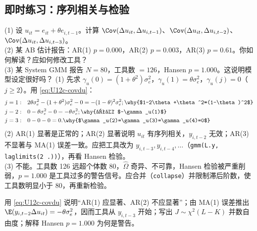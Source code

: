 \subsection{即时练习：序列相关与检验}

\begin{prac}[序列相关与检验]\label{pr:U12c-serial}
(1) 设 $u_{it}=e_{it}+\theta e_{i,t-1}$。计算 $\Cov(\Delta u_{it},\Delta u_{i,t-1})$、$\Cov(\Delta u_{it},\Delta u_{i,t-2})$、$\Cov(\Delta u_{it},\Delta u_{i,t-3})$。\\
(2) 某 AB 估计报告：AR(1) $p=0.000$，AR(2) $p=0.003$，AR(3) $p=0.61$。你如何解读？应如何修改工具？\\
(3) 某 System GMM 报告 $N=80$，工具数 $=126$，Hansen $p=1.000$。这说明模型设定很好吗？
\answer
(1) 先求 $\gamma_u(0)=(1+\theta^2)\sigma_e^2$，$\gamma_u(1)=\theta\sigma_e^2$，$\gamma_u(j)=0$（$j\ge2$）。用 \eqref{eq:U12c-covdu}：
\begin{align*}
j=1:&\quad 2\theta\sigma_e^2-(1+\theta^2)\sigma_e^2-0=-(1-\theta)^2\sigma_e^2; \why{$1-2\theta+\theta^2=(1-\theta)^2$}\\
j=2:&\quad 0-\theta\sigma_e^2-0=-\theta\sigma_e^2; \why{只剩 $-\gamma_u(1)$}\\
j=3:&\quad 0-0-0=0. \why{$\gamma_u(2)=\gamma_u(3)=\gamma_u(4)=0$}
\end{align*}
(2) AR(1) 显著是正常的；AR(2) 显著说明 $u_{it}$ 有序列相关，$y_{i,t-2}$ 无效；AR(3) 不显著与 MA(1) 误差一致。应把工具改为 $y_{i,t-3},y_{i,t-4},\dots$（\texttt{gmm(L.y, laglimits(2 .))}），再看 Hansen 检验。\\
(3) 不能。工具数 126 远超个体数 80，$\hat\Omega$ 奇异、不可靠，Hansen 检验被严重削弱，$p=1.000$ 是工具过多的警告信号。应合并（\texttt{collapse}）并限制滞后阶数，使工具数明显小于 80，再重新检验。
\end{prac}

\begin{keypt}[设定检验的常考点]
用 \eqref{eq:U12c-covdu} 说明“AR(1) 应显著、AR(2) 不应显著”；由 MA(1) 误差推出 $\E(y_{i,t-2}\Delta u_{it})=-\theta\sigma_e^2$，因而工具从 $y_{i,t-3}$ 开始；写出 $J\sim\chi^2(L-K)$ 并数自由度；解释 Hansen $p=1.000$ 为何是警告。
\end{keypt}


